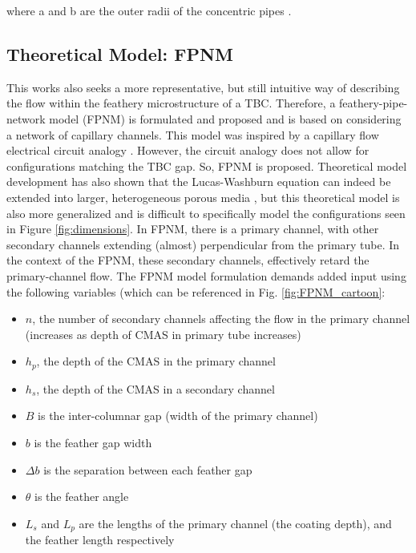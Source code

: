 \documentclass{UCF_ETD}
\begin{document}
\noindent where a and b are the outer radii of the concentric pipes \cite{Naraparaju2019}. 


\subsection{Theoretical Model: FPNM}
\label{sec:pipeNetworkMethod}
This works also seeks a more representative, but still intuitive way of describing the flow within the feathery microstructure of a TBC. Therefore, a feathery-pipe-network model (FPNM)  is formulated and proposed and is based on considering a network of capillary channels. This model was inspired by a capillary flow electrical circuit analogy \cite{Mikaelian2020}. However, the circuit analogy does not allow for configurations matching the TBC gap. So, FPNM is proposed. Theoretical model development has also shown that the Lucas-Washburn equation can indeed be extended into larger, heterogeneous porous media \cite{Cai2021, WAGHMARE2010561}, but this theoretical model is also more generalized and is difficult to specifically model the configurations seen in Figure \ref{fig:dimensions}.
In FPNM, there is a primary channel, with other secondary channels extending (almost) perpendicular from the primary tube. In the context of the FPNM, these secondary channels, effectively retard the primary-channel flow. The FPNM model formulation demands added input using the following variables (which can be referenced in Fig. \ref{fig:FPNM_cartoon}:

\begin{itemize}
    \item $n$, the number of secondary channels affecting the flow in the primary channel (increases as depth of CMAS in primary tube increases)
    \item $h_{p}$, the depth of the CMAS in the primary channel
    \item $h_{s}$, the depth of the CMAS in a secondary channel
    \item $B$ is the inter-columnar gap (width of the primary channel)
    \item $b$ is the feather gap width
    \item $\Delta b$ is the separation between each feather gap
    \item $\theta$ is the feather angle
    \item $L_{s}$ and $L_{p}$ are the lengths of the primary channel (the coating depth), and the feather length respectively
\end{itemize}
\end{document}
